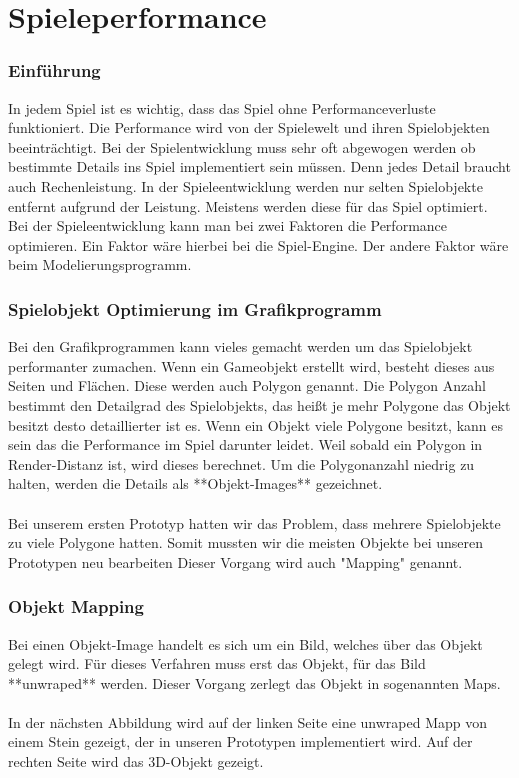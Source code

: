 
\pagebreak
{}
\chapter{Spieleperformance}


\subsection{Einführung}
In jedem Spiel ist es wichtig, dass das Spiel ohne Performanceverluste funktioniert. Die Performance wird von der Spielewelt und ihren Spielobjekten beeinträchtigt. Bei der Spielentwicklung muss sehr oft abgewogen werden ob bestimmte Details ins Spiel implementiert sein müssen. Denn jedes Detail braucht auch Rechenleistung. In der Spieleentwicklung werden nur selten Spielobjekte entfernt aufgrund der Leistung. Meistens werden diese für das Spiel optimiert. Bei der Spieleentwicklung kann man bei zwei Faktoren die Performance optimieren. Ein Faktor wäre hierbei bei die Spiel-Engine. Der andere Faktor wäre beim Modelierungsprogramm.

\subsection{Spielobjekt Optimierung im Grafikprogramm}
Bei den Grafikprogrammen kann vieles gemacht werden um das Spielobjekt performanter zumachen. Wenn ein Gameobjekt erstellt wird, besteht dieses aus Seiten und Flächen. Diese werden auch Polygon genannt. Die Polygon Anzahl bestimmt den Detailgrad des Spielobjekts, das heißt je mehr Polygone das Objekt besitzt desto detaillierter ist es. Wenn ein Objekt viele Polygone besitzt, kann es sein das die Performance im Spiel darunter leidet. Weil sobald ein Polygon in Render-Distanz ist, wird dieses berechnet. Um die Polygonanzahl niedrig zu halten, werden die Details als **Objekt-Images** gezeichnet.\\\\
Bei unserem ersten Prototyp hatten wir das Problem, dass mehrere Spielobjekte zu viele Polygone hatten. Somit mussten wir die meisten Objekte bei unseren Prototypen neu bearbeiten Dieser Vorgang wird auch "Mapping" genannt.
\pagebreak
\subsection{Objekt Mapping}

Bei einen Objekt-Image handelt es sich um ein Bild, welches über das Objekt gelegt wird. Für dieses Verfahren muss erst das Objekt, für das Bild **unwraped** werden. Dieser Vorgang zerlegt das Objekt in sogenannten Maps.\\\\
In der nächsten Abbildung wird auf der linken Seite eine unwraped Mapp von einem Stein gezeigt, der in unseren Prototypen implementiert wird. Auf der rechten Seite wird das 3D-Objekt gezeigt.




